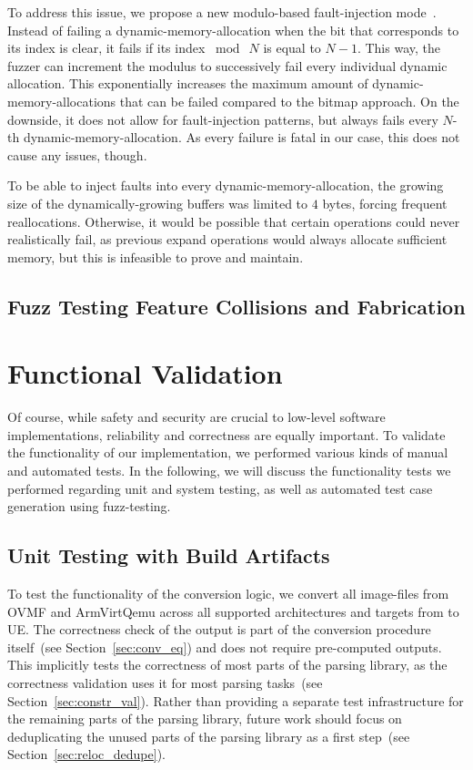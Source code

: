 To address this issue, we propose a new modulo-based \gls{fault-injection} mode~\cite{thesis-git}. Instead of failing a \gls{dynamic-memory-allocation} when the bit that corresponds to its index is clear, it fails if its index $\bmod~N$ is equal to $N - 1$. This way, the fuzzer can increment the modulus to successively fail every individual dynamic allocation. This exponentially increases the maximum amount of \glspl{dynamic-memory-allocation} that can be failed compared to the bitmap approach. On the downside, it does not allow for \gls{fault-injection} patterns, but always fails every $N$-th \gls{dynamic-memory-allocation}. As every failure is fatal in our case, this does not cause any issues, though.

To be able to inject faults into every \gls{dynamic-memory-allocation}, the growing size of the dynamically-growing buffers was limited to $4$ \glspl{byte}, forcing frequent reallocations. Otherwise, it would be possible that certain operations could never realistically fail, as previous expand operations would always allocate sufficient memory, but this is infeasible to prove and maintain.

\subsection{Fuzz Testing Feature Collisions and Fabrication}

\section{Functional Validation}

Of course, while safety and security are crucial to low-level software implementations, reliability and correctness are equally important. To validate the functionality of our implementation, we performed various kinds of manual and automated tests. In the following, we will discuss the functionality tests we performed regarding unit and system testing, as well as automated test case generation using \gls{fuzz-testing}.

\subsection{Unit Testing with Build Artifacts}
\label{sec:unit_tests}

To test the functionality of the conversion logic, we convert all \glspl{image-file} from \gls{OVMF} and \gls{ArmVirtQemu} across all supported architectures and targets from  to \gls{UE}. The correctness check of the output is part of the conversion procedure itself~(see Section~\ref{sec:conv_eq}) and does not require pre-computed outputs. This implicitly tests the correctness of most parts of the parsing library, as the correctness validation uses it for most parsing tasks~(see Section~\ref{sec:constr_val}). Rather than providing a separate test infrastructure for the remaining parts of the parsing library, future work should focus on deduplicating the unused parts of the parsing library as a first step~(see Section~\ref{sec:reloc_dedupe}).

